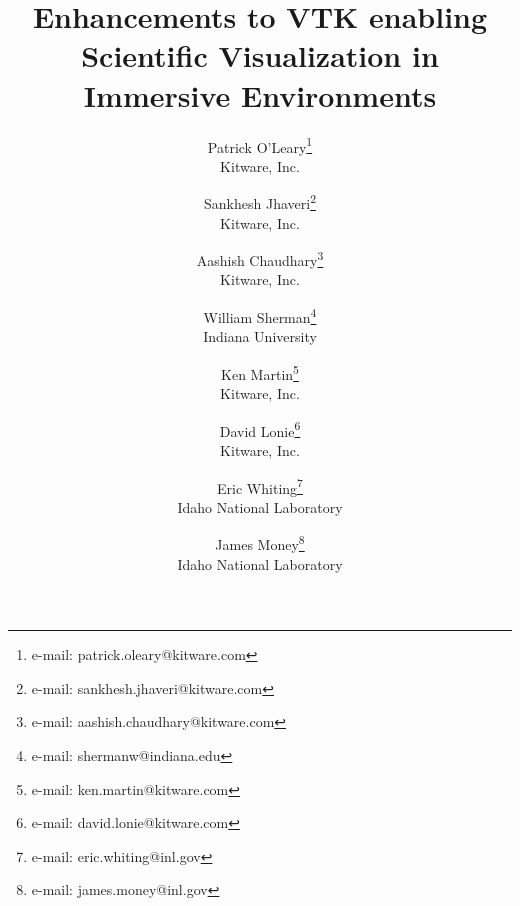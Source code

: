 \title{Enhancements to VTK enabling\\ Scientific Visualization in Immersive Environments}

\author{Patrick O'Leary\thanks{e-mail: patrick.oleary@kitware.com}\\ %
        \scriptsize Kitware, Inc. %
\and Sankhesh Jhaveri\thanks{e-mail: sankhesh.jhaveri@kitware.com}\\ %
        \scriptsize Kitware, Inc. %
\and Aashish Chaudhary\thanks{e-mail: aashish.chaudhary@kitware.com}\\ %
        \scriptsize Kitware, Inc. %
\and William Sherman\thanks{e-mail: shermanw@indiana.edu}\\ %
        \scriptsize Indiana University %
\and Ken Martin\thanks{e-mail: ken.martin@kitware.com}\\ %
        \scriptsize Kitware, Inc. %
\and David Lonie\thanks{e-mail: david.lonie@kitware.com}\\ %
        \scriptsize Kitware, Inc. %
\and Eric Whiting\thanks{e-mail: eric.whiting@inl.gov}\\ %
        \scriptsize Idaho National Laboratory %
\and James Money\thanks{e-mail: james.money@inl.gov}\\ %
        \scriptsize Idaho National Laboratory %
        }
